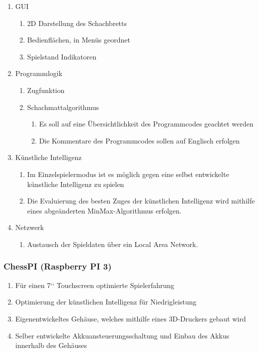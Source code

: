\documentclass[12pt,a4paper]{article}
\begin{document}
\begin{enumerate}
	\item{GUI}
	\begin{enumerate}
		\item{2D Darstellung des Schachbretts}
		\item{Bedienflächen, in Menüs geordnet}
		\item{Spielstand Indikatoren}
	\end{enumerate}
	\item{Programmlogik}
	\begin{enumerate}
		\item{Zugfunktion}
		\item{Schachmattalgorithmus}
		\begin{enumerate}
			\item{Es soll auf eine Übersichtlichkeit des Programmcodes geachtet werden}
			\item{Die Kommentare des Programmcodes sollen auf Englisch erfolgen}
		\end{enumerate}
	\end{enumerate}
	\item{Künstliche Intelligenz}
	\begin{enumerate}
		\item{Im Einzelspielermodus ist es möglich gegen eine selbst entwickelte künstliche Intelligenz zu spielen}
		\item{Die Evaluierung des besten Zuges der künstlichen Intelligenz wird mithilfe eines abgeänderten MinMax-Algorithmus erfolgen.}
	\end{enumerate}
	\item{Netzwerk}
	\begin{enumerate}
		\item{Austausch der Spieldaten über ein Local Area Network.}
	\end{enumerate}
\end{enumerate}

\subsubsection{ChessPI (Raspberry PI 3)}

\begin{enumerate}
	\item{Für einen 7‘‘ Touchscreen optimierte Spielerfahrung}
	\item{Optimierung der künstlichen Intelligenz für Niedrigleistung}
	\item{Eigenentwickeltes Gehäuse, welches mithilfe eines 3D-Druckers gebaut wird}
	\item{Selber entwickelte Akkuansteuerungsschaltung und Einbau des Akkus innerhalb des Gehäuses}
\end{enumerate}
\end{document}
